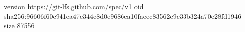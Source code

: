 version https://git-lfs.github.com/spec/v1
oid sha256:96606f60c941ea47e344c8d0e9686ea10faeec83562e9c33b324a70e28fd1946
size 87556
